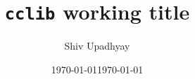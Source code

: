 \documentclass[aip,
jcp,
 amsmath,amssymb,
 preprint,%
 longbibliography]{revtex4-2}
\begin{document}
\title{\texttt{cclib} working title}

\author{Shiv Upadhyay}
\date{\today}










\date{\today}




\begin{abstract}

\end{abstract}
\maketitle 






\end{document}

